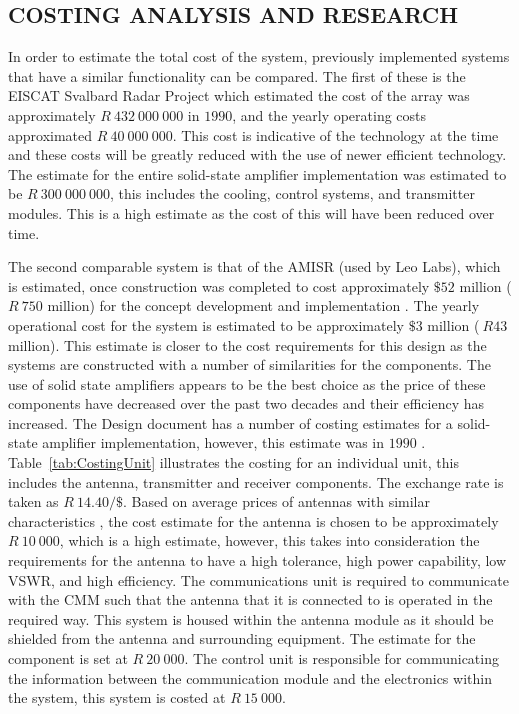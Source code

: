 \documentclass[11pt]{witseiepaper}
\begin{document}
\begin{bibunit}[witseie]
\section{COSTING ANALYSIS AND RESEARCH} \label{sec:CostingAnalysisandResearch}

In order to estimate the total cost of the system, previously implemented systems that have a similar functionality can be compared. The first of these is the EISCAT Svalbard Radar Project \cite[p.~670]{EISCATPrice} which estimated the cost of the array was approximately $R~432~000~000$ in $1990$, and the yearly operating costs approximated $R~40~000~000$. This cost is indicative of the technology at the time and these costs will be greatly reduced with the use of newer efficient technology.
The estimate for the entire solid-state amplifier implementation was estimated to be $R~300~000~000$, this includes the cooling, control systems, and transmitter modules. This is a high estimate as the cost of this will have been reduced over time.

The second comparable system is that of the AMISR (used by Leo Labs), which is estimated, once construction was completed to cost approximately $\$52$ million ($R~750$ million) for the concept development and implementation \cite[p.~333-337]{AMISRCosting}. The yearly operational cost for the system is estimated to be approximately $\$3$ million ($~R43$ million). This estimate is closer to the cost requirements for this design as the systems are constructed with a number of similarities for the components.
The use of solid state amplifiers appears to be the best choice as the price of these components have decreased over the past two decades and their efficiency has increased.
The Design document has a number of costing estimates for a solid-state amplifier implementation, however, this estimate was in $1990$ \cite[p.~37]{DesignDraft}.
Table~\ref{tab:CostingUnit} illustrates the costing for an individual unit, this includes the antenna, transmitter and receiver components. The exchange rate is taken as $R~14.40/\$$.
Based on average prices of antennas with similar characteristics \cite{AntennaPrice1,AntennaPrice2,AntennaPrice3,AntennaPrice4,AntennaPrice5}, the cost estimate for the antenna is chosen to be approximately $R~10~000$, which is a high estimate, however, this takes into consideration the requirements for the antenna to have a high tolerance, high power capability, low VSWR, and high efficiency. The communications unit is required to communicate with the CMM such that the antenna that it is connected to is operated in the required way. This system is housed within the antenna module as it should be shielded from the antenna and surrounding equipment. The estimate for the component is set at $R~20~000$. The control unit is responsible for communicating the information between the communication module and the electronics within the system, this system is costed at $R~15~000$.


\end{bibunit}
\end{document}
